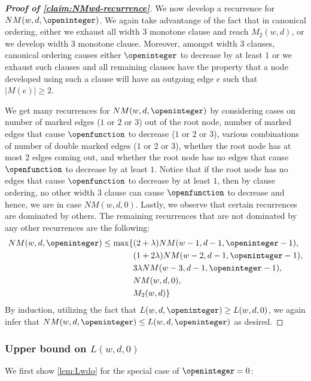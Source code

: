 \begin{proof}[\textbf{Proof of \cref{claim:NMwd-recurrence}}]
We now develop a recurrence for $NM(w, d, \openinteger)$.
We again take advantange of the fact that in canonical ordering, either we exhaust all width $3$ monotone clause and reach $M_2(w, d)$, or we develop width $3$ monotone clause. Moreover, amongst width $3$ clauses, canonical ordering causes either $\openinteger$ to decrease by at least $1$ or we exhaust such clauses and all remaining clauses have the property that a node developed using such a clause will have an outgoing edge $e$ such that $|M(e)| \ge 2$. 

We get many recurrences for $NM(w, d, \openinteger)$ by considering cases on number of marked edges ($1$ or $2$ or $3$) out of the root node, number of marked edges that cause $\openfunction$ to decrease ($1$ or $2$ or $3$), various combinations of number of double marked edges ($1$ or $2$ or $3$), whether the root node has at most $2$ edges coming out, and whether the root node has no edges that cause $\openfunction$ to decrease by at least $1$. Notice that if the root node has no edges that cause $\openfunction$ to decrease by at least $1$, then by clause ordering, no other width $3$ clause can cause $\openfunction$ to decrease and hence, we are in case $NM(w, d, 0)$. Lastly, we observe that certain recurrences are dominated by others. The remaining recurrences that are not dominated by any other recurrences are the following:
\begin{align*}
NM(w, d, \openinteger) \le 
\max\{
& (2+\lambda) NM(w-1, d-1, \openinteger-1),\\
& (1+2\lambda) NM(w-2, d-1, \openinteger-1),\\
& 3\lambda NM(w-3, d-1, \openinteger-1),\\
& NM(w, d, 0),\\
& M_2(w, d)
\}\\
\end{align*}
By induction, utilizing the fact that $L(w, d, \openinteger) \ge L(w, d, 0)$, we again infer that $NM(w, d, \openinteger) \le L(w, d, \openinteger)$ as desired.
\end{proof}





\subsubsection{Upper bound on $L(w, d, 0)$}

We first show \cref{lem:Lwdo} for the special case of $\openinteger = 0$:

